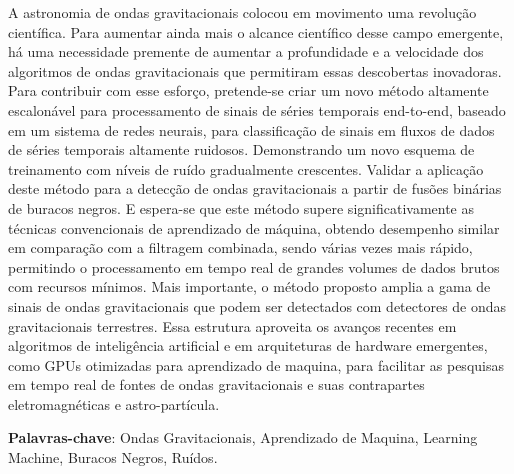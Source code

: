 \setlength{\absparsep}{18pt} %
\begin{resumo}
 
A astronomia de ondas gravitacionais colocou em movimento uma revolução científica. Para aumentar ainda mais o alcance científico desse campo emergente, há uma necessidade premente de aumentar a profundidade e a velocidade dos algoritmos de ondas gravitacionais que permitiram essas descobertas inovadoras. Para contribuir com esse esforço, pretende-se criar  um novo método altamente escalonável para processamento de sinais de séries temporais end-to-end, baseado em um sistema de redes neurais, para classificação de sinais em fluxos de dados de séries temporais altamente ruidosos. Demonstrando um novo esquema de treinamento com níveis de ruído gradualmente crescentes. Validar a aplicação deste método para a detecção de ondas gravitacionais a partir de fusões binárias de buracos negros. E espera-se que este método supere significativamente as técnicas convencionais de aprendizado de máquina, obtendo desempenho similar em comparação com a filtragem combinada, sendo várias vezes mais rápido, permitindo o processamento em tempo real de grandes volumes de dados brutos com recursos mínimos. Mais importante, o método proposto amplia a gama de sinais de ondas gravitacionais que podem ser detectados com detectores de ondas gravitacionais terrestres. Essa estrutura aproveita os avanços recentes em algoritmos de inteligência artificial e em arquiteturas de hardware emergentes, como GPUs otimizadas para aprendizado de maquina, para facilitar as pesquisas em tempo real de fontes de ondas gravitacionais e suas contrapartes eletromagnéticas e astro-partícula.

 \textbf{Palavras-chave}: Ondas Gravitacionais, Aprendizado de Maquina, Learning Machine, Buracos Negros, Ruídos.
\end{resumo}

